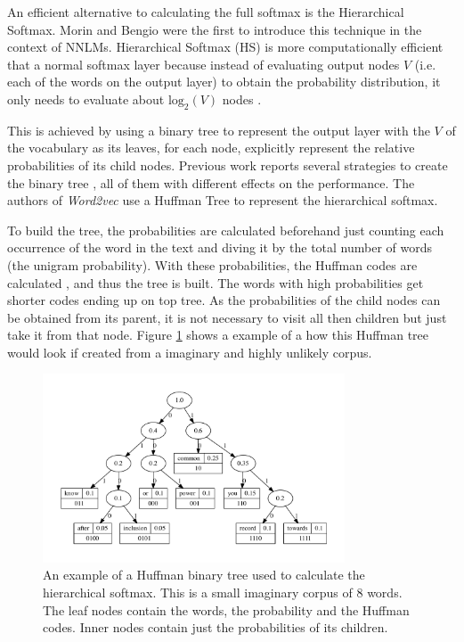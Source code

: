 An efficient alternative to calculating the full softmax is the Hierarchical
Softmax. Morin and
Bengio \cite{Morin05hierarchicalprobabilistic} were the first to introduce
this technique  in the context of \ac{NNLM}s. Hierarchical Softmax (\ac{HS}) is more
computationally efficient that a normal softmax layer because instead of
evaluating output nodes $V$ (i.e. each of the words on the output layer) to
obtain the probability distribution, it only needs to evaluate about
$\text{log}_2 \left( V \right)$ nodes \cite{MikolovSCCD13}.

This is achieved by  using a binary tree to represent the output layer with
the $V$ of the vocabulary as its leaves, for each node, explicitly represent
the relative probabilities of its child nodes. Previous work reports several
strategies to create the binary tree \cite{Mnih08ascalable}, all of them with
different effects on the performance. The authors of \textit{Word2vec} use a
Huffman Tree  to represent the hierarchical softmax.

To build the tree, the probabilities are calculated beforehand just counting
each occurrence of  the word in the text 
and diving it by the total number of words (the unigram probability).  With these probabilities, the
Huffman codes are calculated \cite{huf52}, and thus the tree is built. The
words with high probabilities get shorter codes ending up on top tree. As the
probabilities of the child nodes can be obtained from its parent,  it is not
necessary to visit all then children but just take it from that node. Figure
\ref{fig:huffam-tree-w2v-example} shows a example of a how this Huffman tree
would look if created from a imaginary and  highly unlikely corpus. 




\begin{figure}[h]
    \centering
    \includegraphics[width=0.8\textwidth]{images/htree.pdf} 
    \caption{An example of a Huffman binary tree used to calculate the
      hierarchical softmax. This is a small imaginary corpus of 8 words. The
      leaf nodes contain the words, the probability and the Huffman codes.
      Inner nodes contain just the probabilities of its children. }
    \label{fig:huffam-tree-w2v-example}
\end{figure}

